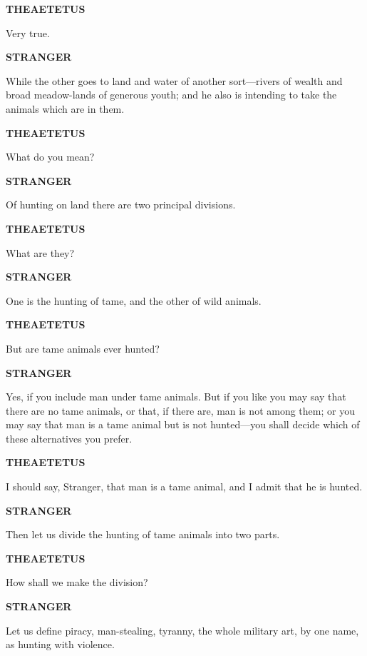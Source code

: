 \documentclass[11pt,letter]{article}
\begin{document}
\par \textbf{THEAETETUS}
\par   Very true.

\par \textbf{STRANGER}
\par   While the other goes to land and water of another sort—rivers of wealth and broad meadow-lands of generous youth; and he also is intending to take the animals which are in them.

\par \textbf{THEAETETUS}
\par   What do you mean?

\par \textbf{STRANGER}
\par   Of hunting on land there are two principal divisions.

\par \textbf{THEAETETUS}
\par   What are they?

\par \textbf{STRANGER}
\par   One is the hunting of tame, and the other of wild animals.

\par \textbf{THEAETETUS}
\par   But are tame animals ever hunted?

\par \textbf{STRANGER}
\par   Yes, if you include man under tame animals. But if you like you may say that there are no tame animals, or that, if there are, man is not among them; or you may say that man is a tame animal but is not hunted—you shall decide which of these alternatives you prefer.

\par \textbf{THEAETETUS}
\par   I should say, Stranger, that man is a tame animal, and I admit that he is hunted.

\par \textbf{STRANGER}
\par   Then let us divide the hunting of tame animals into two parts.

\par \textbf{THEAETETUS}
\par   How shall we make the division?

\par \textbf{STRANGER}
\par   Let us define piracy, man-stealing, tyranny, the whole military art, by one name, as hunting with violence.
\end{document}
